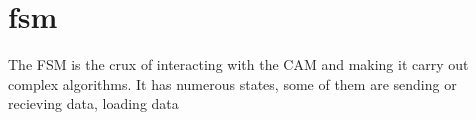 \section{fsm}
The FSM is the crux of interacting with the CAM and making it carry out complex algorithms. It has numerous states, some of them are sending or recieving data, loading data